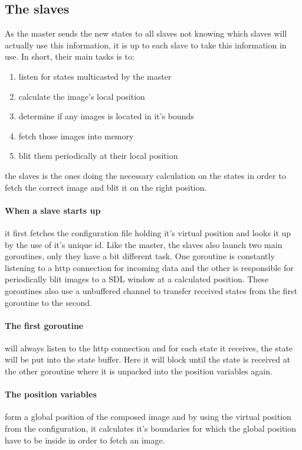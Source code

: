 \documentclass[12pt, a4paper, oneside]{article}
\begin{document}
\subsection{The slaves}
As the master sends the new states to all slaves not knowing which slaves will actually use this information, it is up to each slave to take this information in use. In short, their main tasks is to:
\begin{enumerate}
\item listen for states multicasted by the master
\item calculate the image's local position
\item determine if any images is located in it's bounds
\item fetch those images into memory
\item blit them periodically at their local position
\end{enumerate}

the slaves is the ones doing the necessary calculation on the states in order to fetch the correct image and blit it on the right position.

\paragraph{When a slave starts up}
it first fetches the configuration file holding it's virtual position and looks it up by the use of it's unique id. Like the master, the slaves also launch two main goroutines, only they have a bit different task. One goroutine is constantly listening to a http connection for incoming data and the other is responsible for periodically blit images to a SDL window at a calculated position. These goroutines also use a unbuffered channel to transfer received states from the first goroutine to the second. 

\paragraph{The first goroutine}
will always listen to the http connection and for each state it receives, the state will be put into the state buffer. Here it will block until the state is received at the other goroutine where it is unpacked into the position variables again. 

\paragraph{The position variables}
form a global position of the composed image and by using the virtual position from the configuration, it calculates it's boundaries for which the global position have to be inside in order to fetch an image. 
\end{document}

